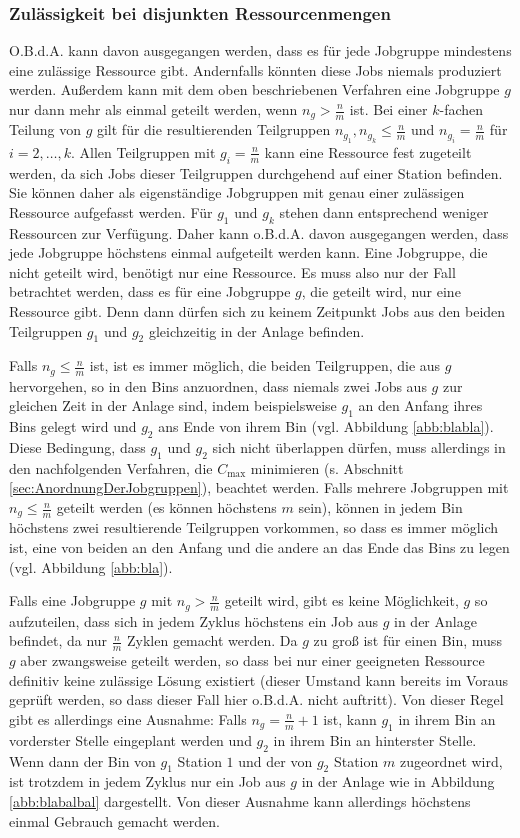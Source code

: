 \documentclass{scrreprt}
\begin{document}
\subsubsection{Zulässigkeit bei disjunkten Ressourcenmengen}
O.B.d.A. kann davon ausgegangen werden, dass es für jede Jobgruppe mindestens eine zulässige Ressource gibt.
Andernfalls könnten diese Jobs niemals produziert werden.
Außerdem kann mit dem oben beschriebenen Verfahren eine Jobgruppe $g$ nur dann mehr als einmal geteilt werden, wenn $n_g > \frac{n}{m}$ ist.
Bei einer $k$-fachen Teilung von $g$ gilt für die resultierenden Teilgruppen $n_{g_1},n_{g_k}\leq\frac{n}{m}$ und $n_{g_i}=\frac{n}{m}$ für $i=2,\ldots,k$.
Allen Teilgruppen mit $g_i=\frac{n}{m}$ kann eine Ressource fest zugeteilt werden, da sich Jobs dieser Teilgruppen durchgehend auf einer Station befinden.
Sie können daher als eigenständige Jobgruppen mit genau einer zulässigen Ressource aufgefasst werden.
Für $g_1$ und $g_k$ stehen dann entsprechend weniger Ressourcen zur Verfügung.
Daher kann o.B.d.A. davon ausgegangen werden, dass jede Jobgruppe höchstens einmal aufgeteilt werden kann.
Eine Jobgruppe, die nicht geteilt wird, benötigt nur eine Ressource.
Es muss also nur der Fall betrachtet werden, dass es für eine Jobgruppe $g$, die geteilt wird, nur eine Ressource gibt.
Denn dann dürfen sich zu keinem Zeitpunkt Jobs aus den beiden Teilgruppen $g_1$ und $g_2$ gleichzeitig in der Anlage befinden.

Falls $n_g \leq \frac{n}{m}$ ist, ist es immer möglich, die beiden Teilgruppen, die aus $g$ hervorgehen,
so in den Bins anzuordnen, dass niemals zwei Jobs aus $g$ zur gleichen Zeit in der Anlage sind, indem beispielsweise
$g_1$ an den Anfang ihres Bins gelegt wird und $g_2$ ans Ende von ihrem Bin (vgl. Abbildung \ref{abb:blabla}).
Diese Bedingung, dass $g_1$ und $g_2$ sich nicht überlappen dürfen, muss allerdings in den nachfolgenden Verfahren, 
die $C_{\max}$ minimieren (s. Abschnitt \ref{sec:AnordnungDerJobgruppen}), beachtet werden.
Falls mehrere Jobgruppen mit $n_g\leq\frac{n}{m}$ geteilt werden (es können höchstens $m$ sein), können in jedem Bin höchstens zwei resultierende 
Teilgruppen vorkommen, so dass es immer möglich ist, eine von beiden an den Anfang und die andere an das Ende das Bins zu legen (vgl. Abbildung \ref{abb:bla}).

Falls eine Jobgruppe $g$ mit $n_g > \frac{n}{m}$ geteilt wird,
gibt es keine Möglichkeit, $g$ so aufzuteilen, 
dass sich in jedem Zyklus höchstens ein Job aus $g$ in der Anlage befindet,
da nur $\frac{n}{m}$ Zyklen gemacht werden. 
Da $g$ zu groß ist für einen Bin, muss $g$ aber zwangsweise geteilt werden, so dass bei nur einer geeigneten Ressource definitiv keine zulässige Lösung existiert
(dieser Umstand kann bereits im Voraus geprüft werden, so dass dieser Fall hier o.B.d.A. nicht auftritt).
Von dieser Regel gibt es allerdings eine Ausnahme:
Falls $n_g = \frac{n}{m}+1$ ist, kann $g_1$ in ihrem Bin an vorderster Stelle eingeplant werden und $g_2$ in ihrem Bin an hinterster Stelle.
Wenn dann der Bin von $g_1$ Station $1$ und der von $g_2$ Station $m$ zugeordnet wird, ist trotzdem in jedem Zyklus nur ein Job aus $g$ in der Anlage 
wie in Abbildung \ref{abb:blabalbal} dargestellt.
Von dieser Ausnahme kann allerdings höchstens einmal Gebrauch gemacht werden.
\end{document}
